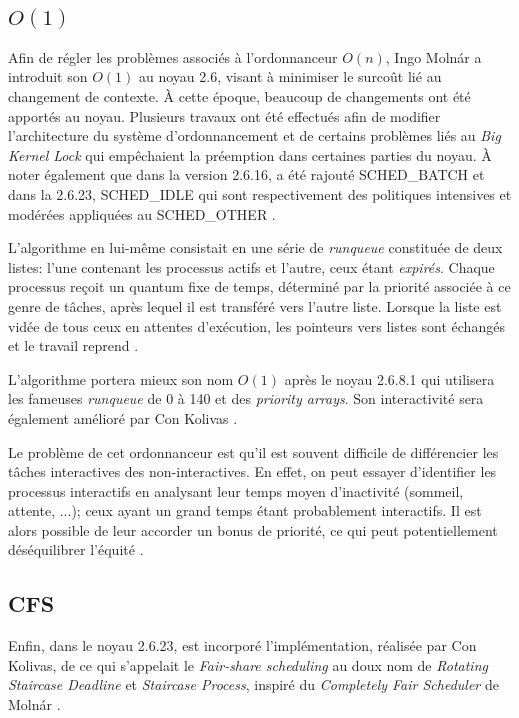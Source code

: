 \documentclass[letterpaper]{article}
\begin{document}
\subsection{$O(1)$}

Afin de régler les problèmes associés à l'ordonnanceur $O(n)$, Ingo Molnár a introduit son $O(1)$ au noyau 2.6, visant à minimiser le surcoût lié au changement de contexte. À cette époque, beaucoup de changements ont été apportés au noyau. Plusieurs travaux ont été effectués afin de modifier l'architecture du système d'ordonnancement et de certains problèmes liés au \textit{Big Kernel Lock} qui empêchaient la préemption dans certaines parties du noyau. À noter également que dans la version 2.6.16, a été rajouté SCHED\_BATCH et dans la 2.6.23, SCHED\_IDLE qui sont respectivement des politiques intensives et modérées appliquées au SCHED\_OTHER \citep{Pabla:2009:CFS:1594371.1594375}. 

L'algorithme en lui-même consistait en une série de \textit{runqueue} constituée de deux listes: l'une contenant les processus actifs et l'autre, ceux étant \textit{expirés}. Chaque processus reçoit un quantum fixe de temps, déterminé par la priorité associée à ce genre de tâches, après lequel il est transféré vers l'autre liste. Lorsque la liste est vidée de tous ceux en attentes d'exécution, les pointeurs vers listes sont échangés et le travail reprend \citep{Love:2010:LKD:1855096}.

L'algorithme portera mieux son nom $O(1)$ après le noyau 2.6.8.1 qui utilisera les fameuses \textit{runqueue} de 0 à 140 et des \textit{priority arrays}. Son interactivité sera également amélioré par Con Kolivas \citep{Aas05understandingthe}.

Le problème de cet ordonnanceur est qu'il est souvent difficile de différencier les tâches interactives des non-interactives. En effet, on peut essayer d'identifier les processus interactifs en analysant leur temps moyen d'inactivité (sommeil, attente, ...); ceux ayant un grand temps étant probablement interactifs. Il est alors possible de leur accorder un bonus de priorité, ce qui peut potentiellement déséquilibrer l'équité \citep{4631872}.

\subsection{CFS}

Enfin, dans le noyau 2.6.23, est incorporé l'implémentation, réalisée par Con Kolivas, de ce qui s'appelait le \textit{Fair-share scheduling} au doux nom de \textit{Rotating Staircase Deadline} et \textit{Staircase Process}, inspiré du \textit{Completely Fair Scheduler} de Molnár \citep{PATCHCFS}.
\end{document}
